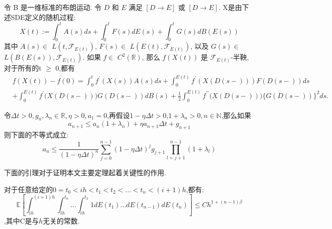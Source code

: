 \begin{lemma}[It\^{o}公式]\label{ito}
	令 B 是一维标准的布朗运动. 令 $D$ 和 $E$ 满足 $[  D\longrightarrow E ]$ 或 $[  D\longrightarrow E ] .$ X是由下述SDE定义的随机过程:
	$$X(t):=\int_0^tA(s)ds+\int_0^tF(s)dE(s)+\int_0^tG(s)dB(E(s))$$
	其中 $A(s)\in$ $L( t, \mathcal{F} _{E(t)})$, $F(s)\in$ $L( E(t), \mathcal{F} _{E(t)})$, 以及 $G(s)\in$ $L( B(E(s)), \mathcal{F} _{E(t)}) .$ 如果 $f\in$ $C^2( \mathbb{R} )$, 那么
	$f(X(t))$ 是 $\mathcal{F}_{E(t)}$-半鞅, 对于所有的t $\ge$ 0,都有
	$$\begin{aligned}
		&f(X(t))-f(0)=\int_{0}^{t}f^{\prime}(X(s))A(s)ds+\int_{0}^{E(t)}f^{\prime}\left(X(D(s-))\right)F(D(s-))ds\\
		&+\int_{0}^{E(t)}f^{\prime}\big(X(D(s-))\big)G(D(s-))dB(s)+\frac{1}{2}\int_{0}^{E(t)}f^{\prime\prime}\big(X(D(s-))\big)\big\{G(D(s-))\big\}^{2}ds.
	\end{aligned}$$
\end{lemma}
\begin{lemma}\label{lemma:1}
	令$\Delta t > 0,g_n,\lambda _n \in \mathbb{R},\eta > 0,a_1=0$,再假设$1-\eta \Delta t > 0$,$1 + \lambda _n > 0,n \in \mathbb{N}$,那么如果
	\begin{equation*}
		a_{n+1} \leq a_n(1+\lambda _n)+\eta a_{n+1}\Delta t +g_{n+1}
	\end{equation*}
	则下面的不等式成立:
	\begin{equation}
		a_n \leq \frac{1}{(1-\eta\Delta t)^n}\sum\limits_{j=0}^{n-1}(1-\eta\Delta t)^jg_{j+1}\prod\limits_{l=j+1}^{n-1}(1+\lambda _l)
	\end{equation}
\end{lemma}
下面的引理对于证明本文主要定理起着关键性的作用.
\begin{lemma}\label{lemma:2}
	对于任意给定的$0 = t_0 < ih < t_1 < t_2 < \ldots <t_n <(i+1)h$,都有:
	\begin{equation}
		\mathbb{E}\left[\int_{ih}^{(i+1)h}
		\int_{ih}^{t_n} \ldots \int_{ih}^{t_2} 1 dE(t_1) \ldots dE(t_{n-1})dE(t_n)\right] \le Ch^{1+(n-1)\beta}
	\end{equation}
	,其中C是与$h$无关的常数.
\end{lemma}



